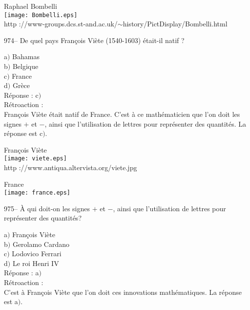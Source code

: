 ﻿\documentclass[letterpaper, 12pt]{article}
\begin{document}
        \begin{center}
        Raphael Bombelli\\
    \texttt{[image: Bombelli.eps]}\\
        {\footnotesize http
://www-groups.dcs.st-and.ac.uk/$\sim$history/PictDisplay/Bombelli.html}
    \end{center}

974-- De quel pays Fran\c cois Vi\`ete (1540-1603) \'etait-il natif
?

a$)$ Bahamas \\
b$)$ Belgique  \\
c$)$ France  \\
d$)$ Gr\`ece\\

R\'eponse : c$)$\\

R\'etroaction : \\
Fran\c cois Vi\`ete \'etait natif de France. C'est \`a ce
math\'ematicien que l'on doit les signes $+$ et $-$, ainsi que
l'utilisation de lettres
pour repr\'esenter des quantit\'es. La r\'eponse est c$)$.\\

        \begin{center}
        Fran\c cois Vi\`ete\\
    \texttt{[image: viete.eps]}\\
        {\footnotesize http ://www.antiqua.altervista.org/viete.jpg}
    \end{center}

        \begin{center}
        France\\
    \texttt{[image: france.eps]}\\
    \end{center}

975-- \`A qui doit-on les signes $+$ et $-$, ainsi que l'utilisation
de lettres pour repr\'esenter des quantit\'es?

a$)$ Fran\c cois Vi\`ete \\
b$)$ Gerolamo Cardano  \\
c$)$ Lodovico Ferrari  \\
d$)$ Le roi Henri IV\\

R\'eponse : a$)$\\

R\'etroaction : \\
C'est \`a Fran\c cois Vi\`ete que l'on doit ces innovations
math\'ematiques. La r\'eponse est a$)$.
\end{document}
